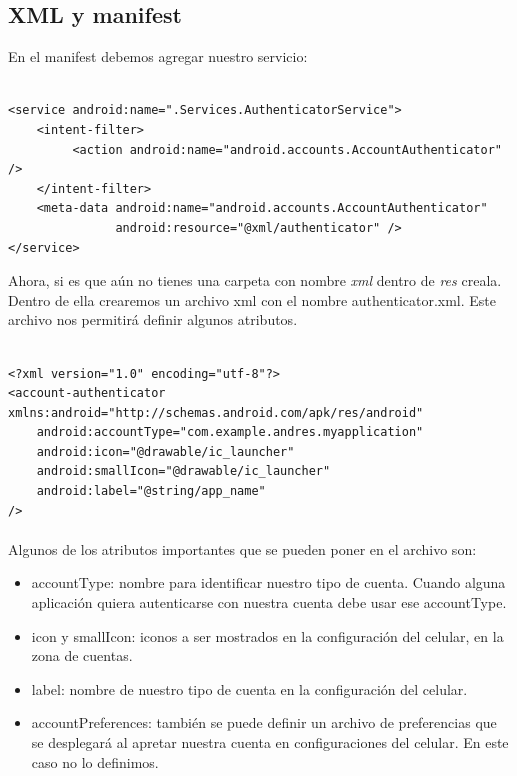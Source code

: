 \documentclass[10pt]{extarticle}
\begin{document}
\subsection{XML y manifest}

En el manifest debemos agregar nuestro servicio:

\begin{lstlisting}

<service android:name=".Services.AuthenticatorService">
	<intent-filter>
	     <action android:name="android.accounts.AccountAuthenticator" />
	</intent-filter>
	<meta-data android:name="android.accounts.AccountAuthenticator"
	           android:resource="@xml/authenticator" />
</service>

\end{lstlisting}

Ahora, si es que aún no tienes una carpeta con nombre \textit{xml} dentro de \textit{res} creala. Dentro de ella crearemos un archivo xml con el nombre authenticator.xml. Este archivo nos permitirá definir algunos atributos.

\begin{lstlisting}

<?xml version="1.0" encoding="utf-8"?>
<account-authenticator xmlns:android="http://schemas.android.com/apk/res/android"
    android:accountType="com.example.andres.myapplication"    
    android:icon="@drawable/ic_launcher"
    android:smallIcon="@drawable/ic_launcher"
    android:label="@string/app_name"
/>

\end{lstlisting}

\paragraph{}
Algunos de los atributos importantes que se pueden poner en el archivo son:

\begin{itemize}
	\item accountType: nombre para identificar nuestro tipo de cuenta. Cuando alguna aplicación quiera autenticarse con nuestra cuenta debe usar ese accountType.
	\item icon y smallIcon: iconos a ser mostrados en la configuración del celular, en la zona de cuentas.
	\item label: nombre de nuestro tipo de cuenta en la configuración del celular.
	\item accountPreferences: también se puede definir un archivo de preferencias que se desplegará al apretar nuestra cuenta en configuraciones del celular. En este caso no lo definimos.
\end{itemize}
\end{document}
